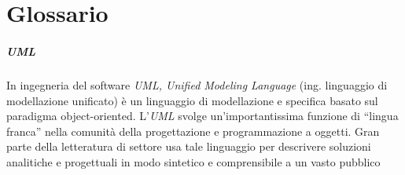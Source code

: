 \chapter{Glossario}

\paragraph{UML} 
\label{UMLl} 
In ingegneria del software \emph{UML, Unified Modeling Language} (ing. linguaggio di modellazione unificato) è un linguaggio di modellazione e specifica basato sul paradigma object-oriented. L'\emph{UML} svolge un'importantissima funzione di ``lingua franca'' nella comunità della progettazione e programmazione a oggetti. Gran parte della letteratura di settore usa tale linguaggio per descrivere soluzioni analitiche e progettuali in modo sintetico e comprensibile a un vasto pubblico

%

